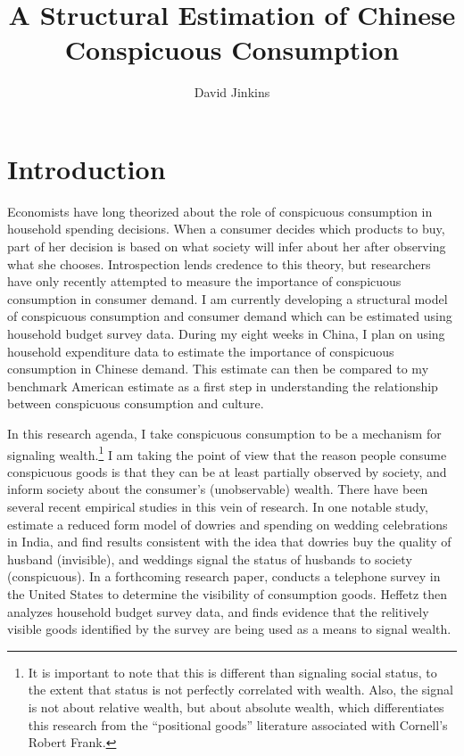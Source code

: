 \documentclass[a4paper,10pt]{article}
\title{A Structural Estimation of Chinese Conspicuous Consumption}
\author{David Jinkins}
\begin{document}
\maketitle

\section{Introduction}
Economists have long theorized about the role of conspicuous consumption in household spending decisions.  When a consumer decides which products to buy, part of her decision is based on what society will infer about her after observing what she chooses.  Introspection lends credence to this theory, but researchers have only recently attempted to measure the importance of conspicuous consumption in consumer demand.  I am currently developing a structural model of conspicuous consumption and consumer demand which can be estimated using household budget survey data.  During my eight weeks in China, I plan on using household expenditure data to estimate the importance of conspicuous consumption in Chinese demand.  This estimate can then be compared to my benchmark American estimate as a first step in understanding the relationship between conspicuous consumption and culture.

In this research agenda, I take conspicuous consumption to be a mechanism for signaling wealth.\footnote{It is important to note that this is different than signaling social status, to the extent that status is not perfectly correlated with wealth.  Also, the signal is not about relative wealth, but about absolute wealth, which differentiates this research from the ``positional goods'' literature associated with Cornell's Robert Frank.}  I am taking the point of view that the reason people consume conspicuous goods is that they can be at least partially observed by society, and inform society about the consumer's (unobservable) wealth.  There have been several recent empirical studies in this vein of research.  In one notable study, \citet{Blochetal2004} estimate a reduced form model of dowries and spending on wedding celebrations in India, and find results consistent with the idea that dowries buy the quality of husband (invisible), and weddings signal the status of husbands to society (conspicuous).  In a forthcoming research paper, \citet{Heffetz2011} conducts a telephone survey in the United States to determine the visibility of consumption goods.  Heffetz then analyzes household budget survey data, and finds evidence that the relitively visible goods identified by the survey are being used as a means to signal wealth. 
\end{document}
